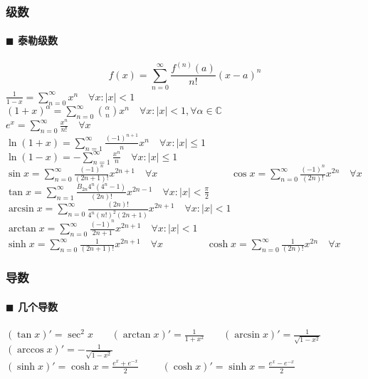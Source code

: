 \subsubsection{级数}
\paragraph{$\blacksquare$ 泰勒级数\\}
$$f(x)=\sum _{n=0}^{\infty }{\frac {f^{(n)}(a)}{n!}}(x-a)^{n}$$
${\displaystyle {\frac {1}{1-x}}=\sum _{n=0}^{\infty }x^{n}\quad \forall x:\left|x\right|<1}$~~~~~~~~~
${\displaystyle (1+x)^{\alpha }=\sum _{n=0}^{\infty }\binom{\alpha}{n} x^{n}\quad \forall x:\left|x\right|<1,\forall \alpha \in \mathbb {C}}$\\
${\displaystyle e^{x}=\sum _{n=0}^{\infty }{\frac {x^{n}}{n!}}\quad \forall x}$\\
${\displaystyle \ln(1+x)=\sum _{n=1}^{\infty }{\frac {(-1)^{n+1}}{n}}x^{n}\quad \forall x:\left| x\right| \leq 1}$~~~~
${\displaystyle \ln(1-x)=-\sum _{n=1}^{\infty }{\frac {x^n}{n}}\quad \forall x:\left| x\right| \leq 1}$\\
${\displaystyle \sin x=\sum _{n=0}^{\infty }{\frac {(-1)^{n}}{(2n+1)!}}x^{2n+1}\quad \forall x}$~~~~~~~~~~~~~~
${\displaystyle \cos x=\sum _{n=0}^{\infty }{\frac {(-1)^{n}}{(2n)!}}x^{2n}\quad \forall x}$\\
${\displaystyle \tan x=\sum _{n=1}^{\infty }{\frac {B_{2n}4^{n}(4^{n}-1)}{(2n)!}}x^{2n-1}\quad \forall x:\left|x\right|<{\frac {\pi }{2}}}$\\
${\displaystyle \arcsin x=\sum _{n=0}^{\infty }{\frac {(2n)!}{4^{n}(n!)^{2}(2n+1)}}x^{2n+1}\quad \forall x:\left|x\right|<1}$\\
${\displaystyle \arctan x=\sum _{n=0}^{\infty }{\frac {(-1)^{n}}{2n+1}}x^{2n+1}\quad \forall x:\left|x\right|<1}$\\
${\displaystyle \sinh x=\sum _{n=0}^{\infty }{\frac {1}{(2n+1)!}}x^{2n+1}\quad \forall x}$~~~~~~~~
${\displaystyle \cosh x=\sum _{n=0}^{\infty }{\frac {1}{(2n)!}}x^{2n}\quad \forall x}$

\subsubsection{导数}
\paragraph{$\blacksquare$ 几个导数\\}
$(\tan x)'=\sec ^2 x$~~~
$(\arctan x)'=\frac{1}{1+x^2}$~~~
$(\arcsin x)'=\frac{1}{\sqrt{1-x^2}}$~~~
$(\arccos x)'=-\frac{1}{\sqrt{1-x^2}}$\\
$(\sinh x)'=\cosh x=\frac{e^x+e^{-x}}{2}$~~~~
$(\cosh x)'=\sinh x=\frac{e^x-e^{-x}}{2}$
